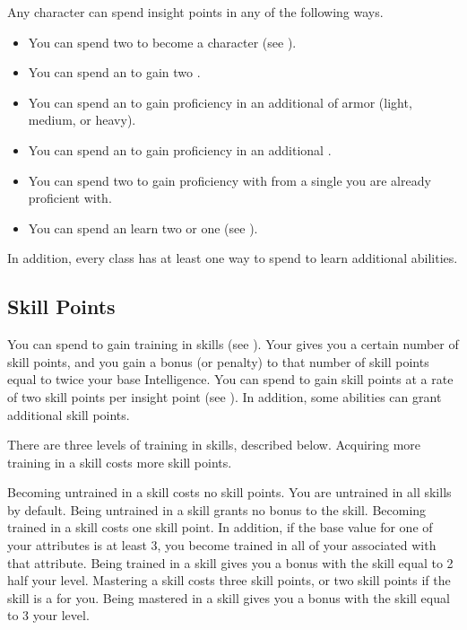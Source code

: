         Any character can spend insight points in any of the following ways.
        \begin{itemize}
            \item You can spend two  to become a  character (see ).
            \item You can spend an  to gain two .
            \item You can spend an  to gain proficiency in an additional  of armor (light, medium, or heavy).
            \item You can spend an  to gain proficiency in an additional .
            \item You can spend two  to gain proficiency with  from a single  you are already proficient with.
            \item You can spend an  learn two  or one  (see ).
        \end{itemize}
        In addition, every class has at least one way to spend  to learn additional abilities.

    \subsection{Skill Points}\label{Skill Points}
        You can spend  to gain training in skills (see ).
        Your  gives you a certain number of skill points, and you gain a bonus (or penalty) to that number of skill points equal to twice your base Intelligence.
        You can spend  to gain skill points at a rate of two skill points per insight point (see ).
        In addition, some abilities can grant additional skill points.

        There are three levels of training in skills, described below.
        Acquiring more training in a skill costs more skill points.
        \begin{itemize}
             Becoming untrained in a skill costs no skill points.
                You are untrained in all skills by default.
                Being untrained in a skill grants no bonus to the skill.
             Becoming trained in a skill costs one skill point.
                In addition, if the base value for one of your attributes is at least 3, you become trained in all of your  associated with that attribute.
                Being trained in a skill gives you a bonus with the skill equal to 2 \add half your level.
             Mastering a skill costs three skill points, or two skill points if the skill is a  for you.
                Being mastered in a skill gives you a bonus with the skill equal to 3 \add your level.
        \end{itemize}

